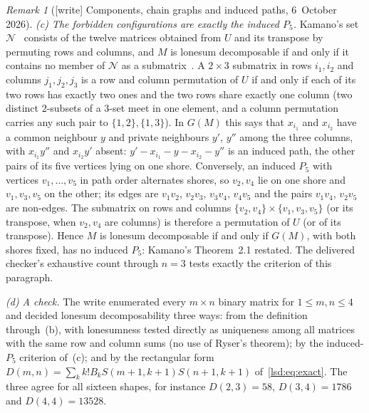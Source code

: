 \documentclass[11pt]{article}
\theoremstyle{remark}\newtheorem{remark}{Remark}
\begin{document}
\begin{remark}[{[write]} Components, chain graphs and induced paths, 6~October 2026]
\emph{(c) The forbidden configurations are exactly the induced $P_5$.}
Kamano's set $\mathcal N$~\cite[Section~2]{Kamano} consists of the twelve
matrices obtained from $U$ and its transpose by permuting rows and columns,
and $M$ is lonesum decomposable if and only if it contains no member of
$\mathcal N$ as a submatrix~\cite[Theorem~2.1]{Kamano}. A $2\times3$
submatrix in rows $i_1,i_2$ and columns $j_1,j_2,j_3$ is a row and column
permutation of $U$ if and only if each of its two rows has exactly two ones
and the two rows share exactly one column (two distinct $2$-subsets of a
$3$-set meet in one element, and a column permutation carries any such pair
to $\{1,2\},\{1,3\}$). In $G(M)$ this says that $x_{i_1}$ and $x_{i_2}$ have a
common neighbour $y$ and private neighbours $y'$, $y''$ among the three
columns, with $x_{i_1}y''$ and $x_{i_2}y'$ absent: $y'-x_{i_1}-y-x_{i_2}-y''$ is
an induced path, the other pairs of its five vertices lying on one shore.
Conversely, an induced $P_5$ with vertices $v_1,\dots,v_5$ in path order
alternates shores, so $v_2,v_4$ lie on one shore and $v_1,v_3,v_5$ on the
other; its edges are $v_1v_2$, $v_2v_3$, $v_3v_4$, $v_4v_5$ and the pairs
$v_1v_4$, $v_2v_5$ are non-edges. The submatrix on rows and columns
$\{v_2,v_4\}\times\{v_1,v_3,v_5\}$ (or its transpose, when $v_2,v_4$ are
columns) is therefore a permutation of $U$ (or of its transpose). Hence $M$
is lonesum decomposable if and only if $G(M)$, with both shores fixed, has no
induced $P_5$: Kamano's Theorem~2.1 restated. The delivered checker's
exhaustive count through $n=3$ tests exactly the criterion of this paragraph.

\emph{(d) A check.} The write enumerated every $m\times n$ binary matrix for
$1\le m,n\le4$ and decided lonesum decomposability three ways: from the
definition through~(b), with lonesumness tested directly as uniqueness among
all matrices with the same row and column sums (no use of Ryser's theorem);
by the induced-$P_5$ criterion of~(c); and by the rectangular form
$D(m,n)=\sum_kk!B_kS(m+1,k+1)S(n+1,k+1)$ of~\eqref{lsd:eq:exact}. The three
agree for all sixteen shapes, for instance $D(2,3)=58$, $D(3,4)=1786$ and
$D(4,4)=13528$.
\end{remark}
\end{document}
